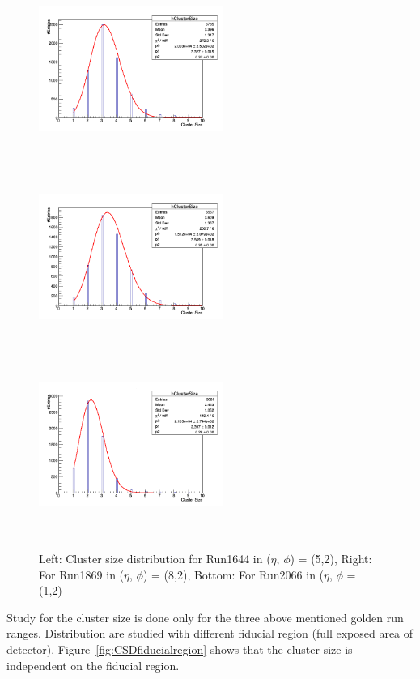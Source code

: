   \begin{figure}[!htbp]
    \begin{center}
      \includegraphics[width=6cm,height=6cm]{figures/GEM/Run1644.png}
      \includegraphics[width=6cm,height=6cm]{figures/GEM/Run1869.png}
      \includegraphics[width=6cm,height=6cm]{figures/GEM/Run2066.png}
    \end{center}
    \caption{Left: Cluster size distribution for Run1644 in ($\eta$, $\phi$) = (5,2), Right: For Run1869 in ($\eta$, $\phi$) = (8,2), Bottom: For Run2066 in ($\eta$, $\phi$ = (1,2)}
    \label{fig:CSDpoissonfunction}
  \end{figure}
Study for the cluster size is done only for the three above mentioned golden run ranges. Distribution are studied with different fiducial region (full exposed area of detector). Figure~\ref{fig:CSDfiducialregion} shows that the cluster size is independent on the fiducial region.
